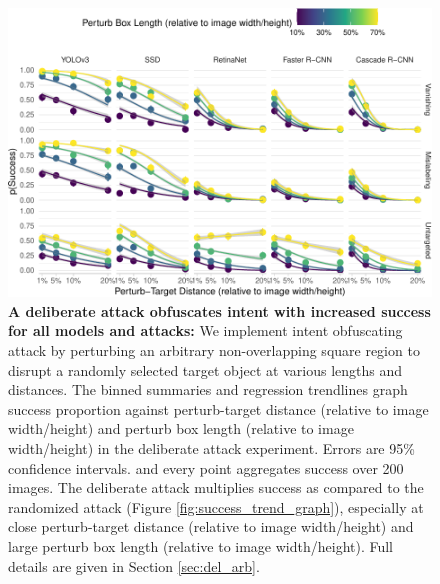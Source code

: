 \begin{figure}[tb]

{\centering \includegraphics[width=1\linewidth]{rmd_imgs/arbitrary_trend_graph-1} 

}

\caption{\textbf{A deliberate attack obfuscates intent with increased success for all models and attacks:}  We implement intent obfuscating attack by perturbing an arbitrary non-overlapping square region to disrupt a randomly selected target object at various lengths and distances. The binned summaries and regression trendlines graph success proportion against perturb-target distance (relative to image width/height) and perturb box length (relative to image width/height) in the deliberate attack experiment. Errors are 95\% confidence intervals.  and every point aggregates success over 200 images. The deliberate attack multiplies success as compared to the randomized attack (Figure \ref{fig:success_trend_graph}), especially at close perturb-target distance (relative to image width/height) and large perturb box length (relative to image width/height). Full details are given in Section \ref{sec:del_arb}.}\label{fig:arbitrary_trend_graph}
\end{figure}
